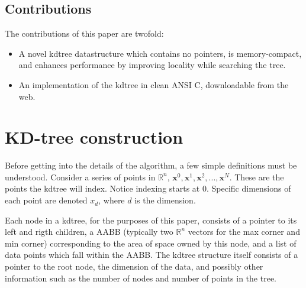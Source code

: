 \documentclass[journal]{IEEEtran}
\newcommand{\x}{\mathbf{x}}
\begin{document}
\subsection{Contributions}
The contributions of this paper are twofold:
\begin{itemize}
    \item A novel kdtree datastructure which contains no pointers, is
    memory-compact, and enhances performance by improving locality while
    searching the tree.
    \item An implementation of the kdtree in clean ANSI C, downloadable from
    the web.
\end{itemize}
 
\section{KD-tree construction}
Before getting into the details of the algorithm, a few simple definitions must
be understood.  Consider a series of points in $\mathbb{R}^n$,
$\x^0,\x^1,\x^2,...,\x^N$. These are the points the kdtree will index.  Notice
indexing starts at 0.  Specific dimensions of each point are denoted $x_d$,
where $d$ is the dimension.

Each node in a kdtree, for the purposes of this paper, consists of a pointer to
its left and rigth children, a AABB (typically two $\mathbb{R}^n$ vectors for
the max corner and min corner) corresponding to the area of space owned by this
node, and a list of data points which fall within the AABB. The kdtree
structure itself consists of a pointer to the root node, the dimension of the
data, and possibly other information such as the number of nodes and number of
points in the tree.
\end{document}
